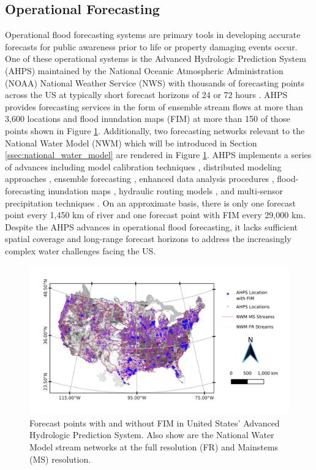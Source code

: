 \documentclass[draft]{dependencies/agujournal2019}
\begin{document}
\subsection{Operational Forecasting}
%
Operational flood forecasting systems are primary tools in developing accurate forecasts for public awareness prior to life or property damaging events occur. 
One of these operational systems is the Advanced Hydrologic Prediction System (AHPS) maintained by the National Oceanic Atmospheric Administration (NOAA) National Weather Service (NWS) with thousands of forecasting points across the US at typically short forecast horizons of 24 or 72 hours \cite{mcenery2005noaa}.
AHPS provides forecasting services in the form of ensemble stream flows at more than 3,600 locations and flood inundation maps (FIM) at more than 150 of those points shown in Figure \ref{fig:forecast_points}.
Additionally, two forecasting networks relevant to the National Water Model (NWM) which will be introduced in Section \ref{ssec:national_water_model} are rendered in Figure \ref{fig:forecast_points}.
AHPS implements a series of advances including model calibration techniques \cite{zhang2003hydrologic,hogue2003multi,duan2003global,gupta2003advances,parada2003multi}, distributed modeling approaches \cite{reed2004overall,koren2004hydrology,duan2002results}, ensemble forecasting \cite{day1985extended,seo2000simulation,mullusky2002simplified,herr2002simplified}, enhanced data analysis procedures \cite{mcenery2005noaa}, flood-forecasting inundation maps \cite{cajina2002fldview}, hydraulic routing models \cite{fread1973technique,cajina2002fldview}, and multi-sensor precipitation techniques \cite{breidenbach1999accounting,kondragunta2001outlier,seo2002real,bonnin1996noaa}.
On an approximate basis, there is only one forecast point every 1,450 km of river and one forecast point with FIM every 29,000 km.
Despite the AHPS advances in operational flood forecasting, it lacks sufficient spatial coverage and long-range forecast horizons to address the increasingly complex water challenges facing the US.
%
\begin{figure}[h!]
\centering
\includegraphics[scale=1.0]{figures/forecast_points.jpg}
\caption{Forecast points with and without FIM in United States' Advanced Hydrologic Prediction System.
Also show are the National Water Model stream networks at the full resolution (FR) and Mainstems (MS) resolution.}
\label{fig:forecast_points}
\end{figure}
%
\end{document}
